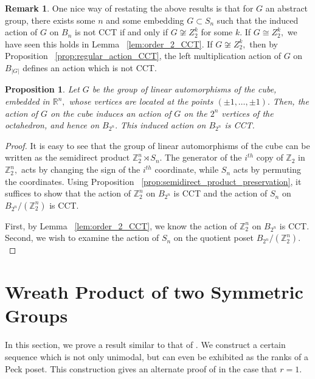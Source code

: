 \documentclass[10 pt]{amsart}
\theoremstyle{plain}
\newtheorem{prop}[thm]{Proposition}
\theoremstyle{definition}
\newtheorem{rem}[thm]{Remark}
\theoremstyle{remark}
\numberwithin{equation}{section}
\begin{document}
\begin{rem}
One nice way of restating the above results is that for $G$ an abstract group, there exists some $n$ and some embedding $G \subset S_n$ such that the induced action of $G$ on $B_n$ is not CCT if and only if $G \not \cong Z_2^k$ for some $k.$ If $G\cong Z_2^k,$ we have seen this holds in Lemma ~\ref{lem:order_2_CCT}. If $G \not \cong Z_2^k,$ then by Proposition ~\ref{prop:regular_action_CCT}, the left multiplication action of $G$ on $B_{|G|}$ defines an action which is not CCT.
\end{rem}
\begin{prop}
Let $G$ be the group of linear automorphisms of the cube, embedded in $\mathbb R^n,$ whose vertices are located at the points $(\pm 1, \ldots, \pm 1).$ Then, the action of $G$ on the cube induces an action of $G$ on the $2^n$ vertices of the octahedron, and hence on $B_{2^n}.$ This induced action on $B_{2^n}$ is CCT. 
\end{prop}
\begin{proof}
It is easy to see that the group of linear automorphisms of the cube can be written as the semidirect product $\mathbb Z^n_2 \rtimes S_n.$ The generator of the $i^{th}$ copy of $\mathbb Z_2$ in $\mathbb Z^n_2,$ acts by changing the sign of the $i^{th}$ coordinate, while $S_n$ acts by permuting the coordinates. Using Proposition ~\ref{prop:semidirect_product_preservation}, it suffices to show that the action of $\mathbb Z_2^n$ on $B_{2^n}$ is CCT and the action of $S_n$ on $B_{2^n}/(\mathbb Z_2^n)$ is CCT.

First, by Lemma ~\ref{lem:order_2_CCT}, we know the action of $\mathbb Z_2^n$ on $B_{2^n}$ is CCT. Second, we wish to examine the action of $S_n$ on the quotient poset $B_{2^n}/(\mathbb Z_2^n).$ 
\end{proof}
\fi






\section{Wreath Product of two Symmetric Groups}\label{sec:wreath_product}

In this section, we prove a result similar to that of \cite[Theorem 1.1]{pak}. We construct a certain sequence which is not only unimodal, but can even be exhibited as the ranks of a Peck poset. This construction gives an alternate proof of \cite[Theorem 1.1]{pak} in the case that $r = 1.$
\end{document}
